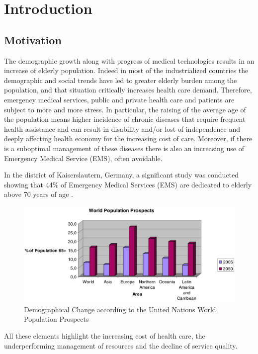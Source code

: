 \documentclass{thesisreport}
\begin{document}
 \listoftables
 
 \tableofcontents
 
 
 \chapter{Introduction}

\section{Motivation}
  The demographic growth along with progress of medical technologies results in an increase of elderly population. Indeed in most of the industrialized countries the demographic and social trends have led to greater elderly burden among the population, and that situation critically increases health care demand. Therefore, emergency medical services, public and private health care and patients are subject to more and more stress. 
  In particular, the raising of the average age of the population means higher incidence of chronic diseases that require frequent health assistance and can result in disability and/or lost of independence and deeply affecting health economy for the increasing cost of care. Moreover, if there is a suboptimal management of these diseases there is also an increasing use of Emergency Medical Service (EMS), often avoidable.
 
 In the district of Kaiserslautern, Germany, a significant study was conducted showing that 44\% of Emergency Medical Services (EMS) are dedicated to elderly above 70 years of age \cite{kleinberger2007ambient}.
 	\begin{figure}[H]
		\centering
		\includegraphics[width=15cm]{Thesis/data/populationProspect.png}
		\caption{\small{Demographical Change according to the United Nations World Population Prospects \cite{kleinberger2007ambient}}}
		\label{fig:populationProspect}
	\end{figure}
 All these elements highlight the increasing cost of health care, the underperforming management of resources and the decline of service quality.
 
\end{document}

